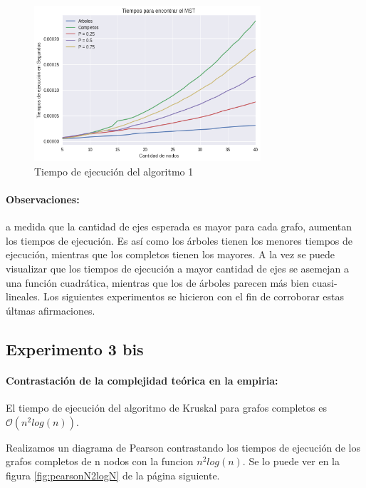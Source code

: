 \documentclass[a4paper]{report}
\begin{document}
\begin{figure}[h]
    \centering
    \includegraphics[width=0.75\textwidth]{tiempoDeMst.png}
    \caption{Tiempo de ejecución del algoritmo 1}
    \label{fig:tiemposmst}
\end{figure}

\paragraph{Observaciones: } a medida que la cantidad de ejes esperada es mayor para cada grafo, aumentan los tiempos de ejecución. Es así como los árboles tienen los menores tiempos de ejecución, mientras que los completos tienen los mayores. A la vez se puede visualizar que los tiempos de ejecución a mayor cantidad de ejes se asemejan a una función cuadrática, mientras que los de árboles parecen más bien cuasi-lineales. Los siguientes experimentos se hicieron con el fin de corroborar estas últmas afirmaciones.

\subsection{Experimento 3 bis}

\paragraph{Contrastación de la complejidad teórica en la empiria: } El tiempo de ejecución del algoritmo de Kruskal para grafos completos es $\mathcal{O}(n^2log(n))$.

\medskip

Realizamos un diagrama de Pearson contrastando los tiempos de ejecución de los grafos completos de n nodos con la funcion $n^2log(n)$. Se lo puede ver en la figura \ref{fig:pearsonN2logN} de la página siguiente.

\newpage
\end{document}
